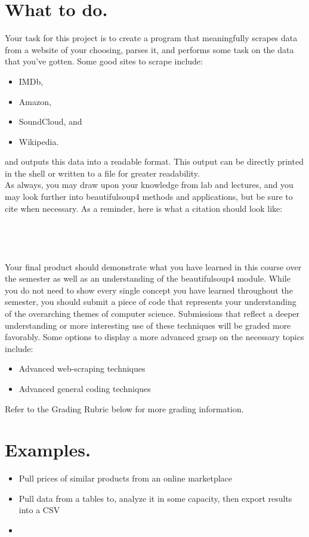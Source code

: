 \documentclass[11pt, letterpaper, onecolumn, oneside, final]{article}
\begin{document}
    \section{What to do.}
    Your task for this project is to create a program that meaningfully scrapes data from a website of your choosing, parses it, and performs some task on the data that you've gotten. Some good sites to scrape include:
\begin{itemize}
    \item IMDb,
    \item Amazon,
    \item SoundCloud, and
    \item Wikipedia.
\end{itemize}
    and outputs this data into a readable format. This output can be directly printed in the shell or written to a file for greater readability.
    \\ 
    As always, you may draw upon your knowledge from lab and lectures, and you may look further into {\consolas beautifulsoup4} methods and applications, but be sure to cite when necessary. As a reminder, here is what a citation should look like:\\
    \\
    \\
    \\ 
    \\
    Your final product should demonstrate what you have learned in this course over the semester as well as an understanding of the {\consolas beautifulsoup4} module. While you do not need to show every single concept you have learned throughout the semester, you should submit a piece of code that represents your understanding of the overarching themes of computer science.
    Submissions that reflect a deeper understanding or more interesting use of these techniques will be graded more favorably. Some options to display a more advanced grasp on the necessary topics include:
    
\begin{itemize}
    \item Advanced web-scraping techniques
    \item Advanced general coding techniques
\end{itemize}

Refer to the Grading Rubric below for more grading information.
\newpage
\section{Examples.}
\begin{itemize}
    \item Pull prices of similar products from an online marketplace
    \item Pull data from a tables to, analyze it in some capacity, then export results into a CSV
    \item 
\end{itemize}
\end{document}
